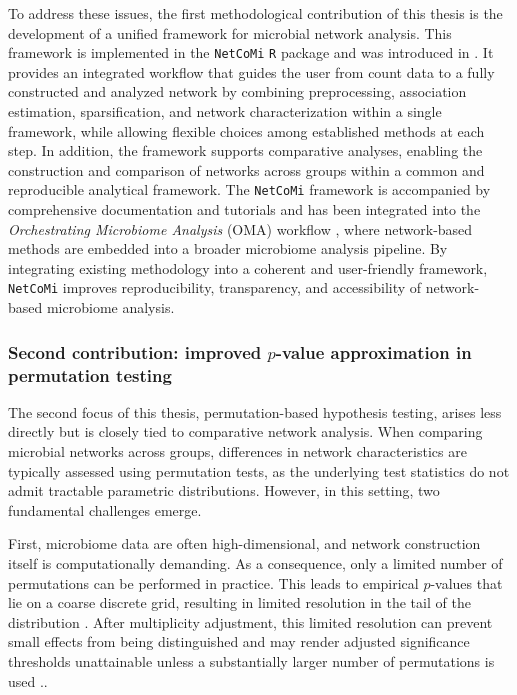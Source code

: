 To address these issues, the first methodological contribution of this thesis is the development of a unified framework for microbial network analysis. 
This framework is implemented in the \texttt{NetCoMi} \texttt{R} package \citep{peschel2026netcomi} and was introduced in \citet{peschel2021netcomi}. 
It provides an integrated workflow that guides the user from count data to a fully constructed and analyzed network by combining preprocessing, association estimation, sparsification, and network characterization within a single framework, while allowing flexible choices among established methods at each step. 
In addition, the framework supports comparative analyses, enabling the construction and comparison of networks across groups within a common and reproducible analytical framework. 
The \texttt{NetCoMi} framework is accompanied by comprehensive documentation and tutorials and has been integrated into the \emph{Orchestrating Microbiome Analysis} (OMA) workflow \citep{borman2024orchestrating}, where network-based methods are embedded into a broader microbiome analysis pipeline. 
By integrating existing methodology into a coherent and user-friendly framework, \texttt{NetCoMi} improves reproducibility, transparency, and accessibility of network-based microbiome analysis.

\subsubsection*{Second contribution: improved $p$-value approximation in permutation testing}
The second focus of this thesis, permutation-based hypothesis testing, arises less directly but is closely tied to comparative network analysis. 
When comparing microbial networks across groups, differences in network characteristics are typically assessed using permutation tests, as the underlying test statistics do not admit tractable parametric distributions. 
However, in this setting, two fundamental challenges emerge.

First, microbiome data are often high-dimensional, and network construction itself is computationally demanding. 
As a consequence, only a limited number of permutations can be performed in practice. 
This leads to empirical $p$-values that lie on a coarse discrete grid, resulting in limited resolution in the tail of the distribution \citep{north2002note, phipson2010permutation}. 
After multiplicity adjustment, this limited resolution can prevent small effects from being distinguished and may render adjusted significance thresholds unattainable unless a substantially larger number of permutations is used \citep{phipson2010permutation, gilbert2005modified}..

